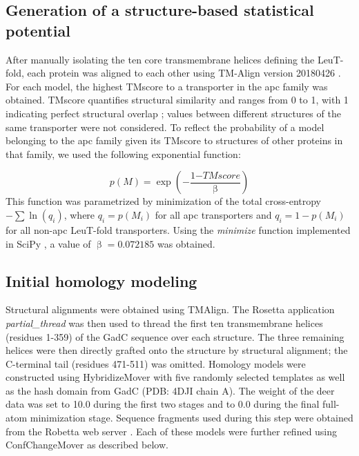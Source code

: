 \subsection{Generation of a structure-based statistical potential}\label{sec:gadc_potential}

After manually isolating the ten core transmembrane helices defining the LeuT-fold, each protein was aligned to each other using TM-Align version 20180426 \citep*{Zhang2005}. For each model, the highest TMscore \citep*{Zhang2004} to a transporter in the \gls{apc} family was obtained. TMscore quantifies structural similarity and ranges from 0 to 1, with 1 indicating perfect structural overlap \citep*{Xu2010}; values between different structures of the same transporter were not considered. To reflect the probability of a model belonging to the \gls{apc} family given its TMscore to structures of other proteins in that family, we used the following exponential function:

\begin{equation}
    p(M)=\exp \left( -\frac{1\mathrm{-}TMscore}{\upbeta} \right)
\end{equation}
This function was parametrized by minimization of the total cross-entropy $-\sum{\ln \left(q_i\right)}$, where $q_i=p(M_i)$ for all \gls{apc} transporters and $q_i=1-p(M_i)$ for all non-\gls{apc} LeuT-fold transporters. Using the \emph{minimize} function implemented in SciPy \citep*{Virtanen2020}, a value of $\upbeta=0.072185$ was obtained.

\subsection{Initial homology modeling}

Structural alignments were obtained using TMAlign. The Rosetta application \emph{partial\_thread} was then used to thread the first ten transmembrane helices (residues 1-359) of the GadC sequence over each structure. The three remaining helices were then directly grafted onto the structure by structural alignment; the C-terminal tail (residues 471-511) was omitted. Homology models were constructed using HybridizeMover \citep*{Song2013} with five randomly selected templates as well as the hash domain from GadC (PDB: 4DJI chain A). The weight of the \gls{deer} data was set to 10.0 during the first two stages and to 0.0 during the final full-atom minimization stage. Sequence fragments used during this step were obtained from the Robetta web server \citep*{Kim2004}. Each of these models were further refined using ConfChangeMover as described below.

